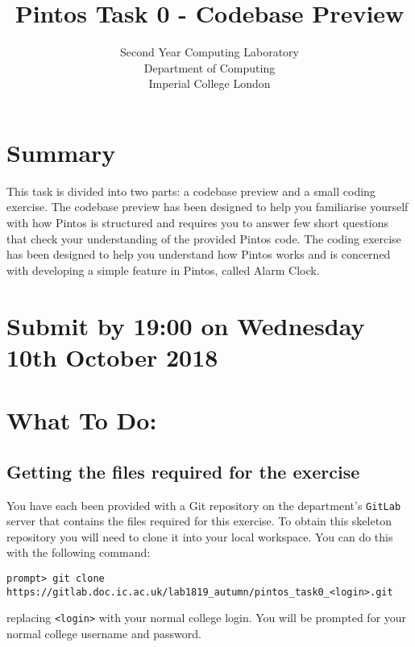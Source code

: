 \documentclass[a4paper,12pt]{article}
\newcommand{\shell}[1]{\lstinline!#1!}
\begin{document}

\title{Pintos Task 0 - Codebase Preview}
\date{}

\author{
Second Year Computing Laboratory \\ 
Department of Computing \\ 
Imperial College London
}

\maketitle

\section*{Summary}
This task is divided into two parts: a codebase preview and a small coding exercise.
The codebase preview has been designed to help you familiarise yourself with how Pintos is structured 
and requires you to answer few short questions that check your understanding of the provided Pintos code.
The coding exercise has been designed to help you understand how Pintos works 
and is concerned with developing a simple feature in Pintos, called Alarm Clock.

\section*{Submit by 19:00 on Wednesday 10th October 2018}

\section*{What To Do:}

\subsection*{Getting the files required for the exercise}

You have each been provided with a Git repository on the department's \shell{GitLab} server that contains the files required for this exercise.
To obtain this skeleton repository you will need to clone it into your local workspace.
You can do this with the following command:
%
\begin{lstlisting}
prompt> git clone https://gitlab.doc.ic.ac.uk/lab1819_autumn/pintos_task0_<login>.git
\end{lstlisting}
%
replacing \shell{<login>} with your normal college login.
You will be prompted for your normal college username and password.
\end{document}
